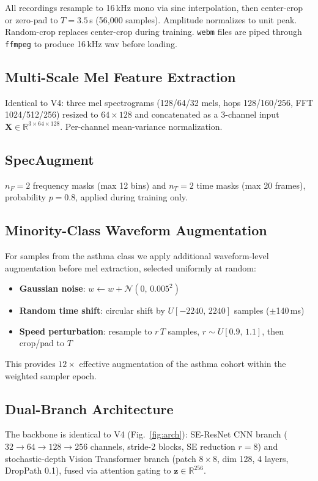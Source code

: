 \documentclass[journal]{IEEEtran}
\newcommand{\R}{\mathbb{R}}
\begin{document}
All recordings resample to 16\,kHz mono via sinc interpolation,
then center-crop or zero-pad to $T{=}3.5$\,s (56,000 samples).
Amplitude normalizes to unit peak. Random-crop replaces center-crop
during training. \texttt{webm} files are piped through \texttt{ffmpeg}
to produce 16\,kHz wav before loading.

\subsection{Multi-Scale Mel Feature Extraction}

Identical to V4: three mel spectrograms (128/64/32 mels, hops
128/160/256, FFT 1024/512/256) resized to $64{\times}128$ and
concatenated as a 3-channel input $\mathbf{X}\in\R^{3\times64\times128}$.
Per-channel mean-variance normalization.

\subsection{SpecAugment}

$n_F{=}2$ frequency masks (max 12 bins) and $n_T{=}2$ time masks
(max 20 frames), probability $p{=}0.8$, applied during training only.

\subsection{Minority-Class Waveform Augmentation}

For samples from the asthma class we apply additional waveform-level
augmentation before mel extraction, selected uniformly at random:
\begin{itemize}
\item \textbf{Gaussian noise}: $w \leftarrow w + \mathcal{N}(0,\,0.005^2)$
\item \textbf{Random time shift}: circular shift by
      $U[-2240,\,2240]$ samples ($\pm$140\,ms)
\item \textbf{Speed perturbation}: resample to $r\,T$ samples,
      $r\sim U[0.9,\,1.1]$, then crop/pad to $T$
\end{itemize}
This provides $12{\times}$ effective augmentation of the asthma
cohort within the weighted sampler epoch.

\subsection{Dual-Branch Architecture}
\label{sec:arch}

The backbone is identical to V4 (Fig.~\ref{fig:arch}):
SE-ResNet CNN branch ($32{\to}64{\to}128{\to}256$ channels, stride-2
blocks, SE reduction $r{=}8$) and stochastic-depth Vision Transformer
branch (patch $8{\times}8$, dim 128, 4 layers, DropPath 0.1),
fused via attention gating to $\mathbf{z}\in\R^{256}$.
\end{document}
